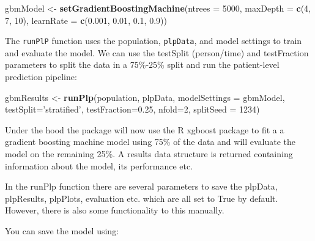 \documentclass[
]{article}
\newenvironment{Shaded}{\begin{snugshade}}{\end{snugshade}}
\newcommand{\DataTypeTok}[1]{\textcolor[rgb]{0.13,0.29,0.53}{#1}}
\newcommand{\DecValTok}[1]{\textcolor[rgb]{0.00,0.00,0.81}{#1}}
\newcommand{\FloatTok}[1]{\textcolor[rgb]{0.00,0.00,0.81}{#1}}
\newcommand{\KeywordTok}[1]{\textcolor[rgb]{0.13,0.29,0.53}{\textbf{#1}}}
\newcommand{\NormalTok}[1]{#1}
\newcommand{\OperatorTok}[1]{\textcolor[rgb]{0.81,0.36,0.00}{\textbf{#1}}}
\newcommand{\StringTok}[1]{\textcolor[rgb]{0.31,0.60,0.02}{#1}}
\begin{document}
\begin{Shaded}
\begin{Highlighting}[]
\NormalTok{gbmModel <-}\StringTok{ }\KeywordTok{setGradientBoostingMachine}\NormalTok{(}\DataTypeTok{ntrees =} \DecValTok{5000}\NormalTok{, }\DataTypeTok{maxDepth =} \KeywordTok{c}\NormalTok{(}\DecValTok{4}\NormalTok{, }\DecValTok{7}\NormalTok{, }\DecValTok{10}\NormalTok{), }\DataTypeTok{learnRate =} \KeywordTok{c}\NormalTok{(}\FloatTok{0.001}\NormalTok{, }
    \FloatTok{0.01}\NormalTok{, }\FloatTok{0.1}\NormalTok{, }\FloatTok{0.9}\NormalTok{))}
\end{Highlighting}
\end{Shaded}

The \texttt{runPlP} function uses the population, \texttt{plpData}, and
model settings to train and evaluate the model. We can use the testSplit
(person/time) and testFraction parameters to split the data in a
75\%-25\% split and run the patient-level prediction pipeline:

\begin{Shaded}
\begin{Highlighting}[]
\NormalTok{    gbmResults <-}\StringTok{ }\KeywordTok{runPlp}\NormalTok{(population, plpData, }\DataTypeTok{modelSettings =}\NormalTok{ gbmModel, }\DataTypeTok{testSplit=}\StringTok{'stratified'}\NormalTok{, }
                         \DataTypeTok{testFraction=}\FloatTok{0.25}\NormalTok{, }\DataTypeTok{nfold=}\DecValTok{2}\NormalTok{, }\DataTypeTok{splitSeed =} \DecValTok{1234}\NormalTok{)}
\end{Highlighting}
\end{Shaded}

Under the hood the package will now use the R xgboost package to fit a a
gradient boosting machine model using 75\% of the data and will evaluate
the model on the remaining 25\%. A results data structure is returned
containing information about the model, its performance etc.

In the runPlp function there are several parameters to save the plpData,
plpResults, plpPlots, evaluation etc. which are all set to True by
default. However, there is also some functionality to this manually.

You can save the model using:

\begin{Shaded}
\end{Shaded}
\end{document}
